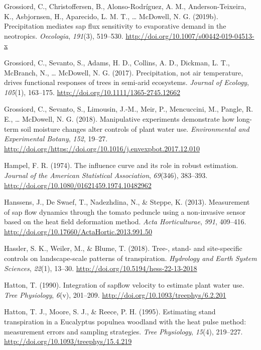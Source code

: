 \documentclass[11pt,twoside]{reedthesis}
\begin{document}
\hypertarget{ref-grossiord_precipitation_2019}{}
Grossiord, C., Christoffersen, B., Alonso-Rodríguez, A. M.,
Anderson-Teixeira, K., Asbjornsen, H., Aparecido, L. M. T., \ldots{}
McDowell, N. G. (2019b). Precipitation mediates sap flux sensitivity to
evaporative demand in the neotropics. \emph{Oecologia}, \emph{191}(3),
519--530. \url{http://doi.org/10.1007/s00442-019-04513-x}

\hypertarget{ref-grossiord_precipitation_2017}{}
Grossiord, C., Sevanto, S., Adams, H. D., Collins, A. D., Dickman, L.
T., McBranch, N., \ldots{} McDowell, N. G. (2017). Precipitation, not
air temperature, drives functional responses of trees in semi-arid
ecosystems. \emph{Journal of Ecology}, \emph{105}(1), 163--175.
\url{http://doi.org/10.1111/1365-2745.12662}

\hypertarget{ref-Grossiord2018}{}
Grossiord, C., Sevanto, S., Limousin, J.-M., Meir, P., Mencuccini, M.,
Pangle, R. E., \ldots{} McDowell, N. G. (2018). Manipulative experiments
demonstrate how long-term soil moisture changes alter controls of plant
water use. \emph{Environmental and Experimental Botany}, \emph{152},
19--27.
\url{http://doi.org/https://doi.org/10.1016/j.envexpbot.2017.12.010}

\hypertarget{ref-Hampel1974}{}
Hampel, F. R. (1974). The influence curve and its role in robust
estimation. \emph{Journal of the American Statistical Association},
\emph{69}(346), 383--393.
\url{http://doi.org/10.1080/01621459.1974.10482962}

\hypertarget{ref-Hanssens2013}{}
Hanssens, J., De Swaef, T., Nadezhdina, N., \& Steppe, K. (2013).
Measurement of sap flow dynamics through the tomato peduncle using a
non-invasive sensor based on the heat field deformation method.
\emph{Acta Horticulturae}, \emph{991}, 409--416.
\url{http://doi.org/10.17660/ActaHortic.2013.991.50}

\hypertarget{ref-Hassler2018}{}
Hassler, S. K., Weiler, M., \& Blume, T. (2018). Tree-, stand- and
site-specific controls on landscape-scale patterns of transpiration.
\emph{Hydrology and Earth System Sciences}, \emph{22}(1), 13--30.
\url{http://doi.org/10.5194/hess-22-13-2018}

\hypertarget{ref-Hatton1990}{}
Hatton, T. (1990). Integration of sapflow velocity to estimate plant
water use. \emph{Tree Physiology}, \emph{6}(v), 201--209.
\url{http://doi.org/10.1093/treephys/6.2.201}

\hypertarget{ref-Hatton1995}{}
Hatton, T. J., Moore, S. J., \& Reece, P. H. (1995). Estimating stand
transpiration in a Eucalyptus populnea woodland with the heat pulse
method: measurement errors and sampling strategies. \emph{Tree
Physiology}, \emph{15}(4), 219--227.
\url{http://doi.org/10.1093/treephys/15.4.219}
\end{document}
